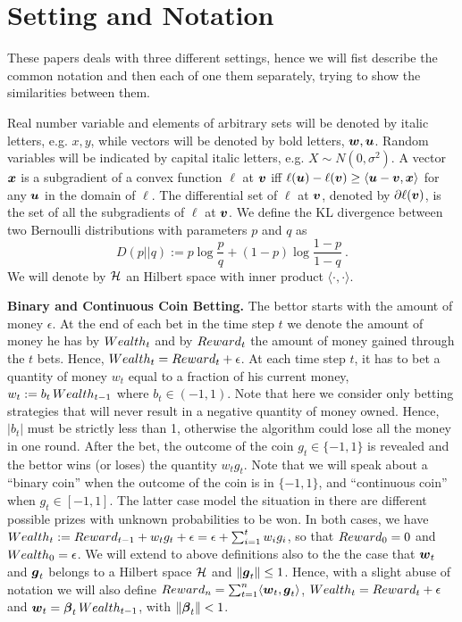 \section{Setting and Notation}
These papers deals with three different settings, hence we will fist describe the common notation and then each of one them separately, trying to show the similarities between them.

Real number variable and elements of arbitrary sets will be denoted by italic letters, e.g. $x,y$, while vectors will be denoted by bold letters, $\boldsymbol{w},\boldsymbol{u}$.
Random variables will be indicated by capital italic letters, e.g. $X \sim N(0,\sigma^2)$.
A vector $\boldsymbol{x}$ is a subgradient of a convex function $\ell$ at $\boldsymbol{v}$ iff $\ell(\boldsymbol{u}) - \ell(\boldsymbol{v}) \ge \langle \boldsymbol{u} - \boldsymbol{v}, \boldsymbol{x} \rangle$ for any $\boldsymbol{u}$ in the domain of $\ell$. The differential set of $\ell$ at $\boldsymbol{v}$, denoted by $\partial \ell(\boldsymbol{v})$, is the set of all the subgradients of $\ell$ at $\boldsymbol{v}$.
We define the KL divergence between two Bernoulli distributions with parameters $p$ and $q$ as
\[
D(p||q) := p \log\frac{p}{q} + (1-p) \log\frac{1-p}{1-q}~.
\]
We will denote by $\mathcal{H}$ an Hilbert space with inner product $\langle \cdot, \cdot\rangle$.

\vspace{0.2cm}\noindent\textbf{Binary and Continuous Coin Betting.}
The bettor starts with the amount of money $\epsilon$. 
At the end of each bet in the time step $t$ we denote the amount of money he has by $Wealth_t$ and by $Reward_t$ the amount of money gained through the $t$ bets. Hence, $Wealth_t=Reward_t+\epsilon$.
At each time step $t$, it has to bet a quantity of money $w_t$ equal to a fraction of his current money, $w_t:=b_t \, Wealth_{t-1}$ where $b_t \in (-1,1)$. Note that here we consider only betting strategies that will never result in a negative quantity of money owned. Hence, $|b_t|$ must be strictly less than 1, otherwise the algorithm could lose all the money in one round.
After the bet, the outcome of the coin $g_t \in \{-1,1\}$ is revealed and the bettor wins (or loses) the quantity $w_t g_t$.
Note that we will speak about a ``binary coin'' when the outcome of the coin is in $\{-1,1\}$, and ``continuous coin'' when $g_t \in [-1,1]$. The latter case model the situation in there are different possible prizes with unknown probabilities to be won. In both cases, we have $Wealth_t:=Reward_{t-1} + w_t g_t + \epsilon= \epsilon + \sum_{i=1}^t w_i g_i$, so that $Reward_0=0$ and $Wealth_0=\epsilon$.
We will extend to above definitions also to the the case that $\boldsymbol{w}_t$ and $\boldsymbol{g}_t$ belongs to a Hilbert space $\mathcal{H}$ and $\left\|{\boldsymbol{g}_t}\right\|\leq 1$. Hence, with a slight abuse of notation we will also define $Reward_n=\sum_{t=1}^n \langle \boldsymbol{w}_t, \boldsymbol{g}_t \rangle$, $Wealth_t=Reward_t + \epsilon$ and $\boldsymbol{w}_t = \boldsymbol{\beta}_t \, Wealth_{t-1}$, with $\left\|{\boldsymbol{\beta}_t}\right\| < 1$.

